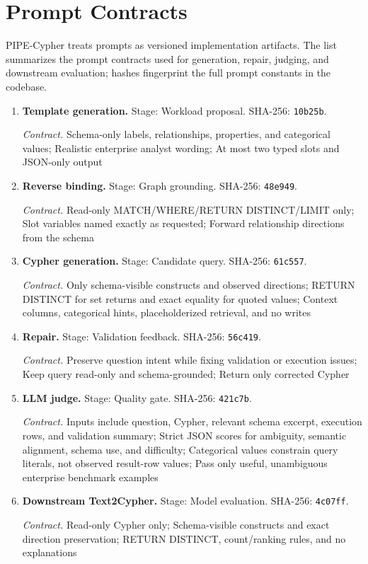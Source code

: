\section{Prompt Contracts}
\label{tab:prompt_contracts}
PIPE-Cypher treats prompts as versioned implementation artifacts. The list summarizes the prompt contracts used for generation, repair, judging, and downstream evaluation; hashes fingerprint the full prompt constants in the codebase.
\begin{enumerate}
\item \textbf{Template generation.} Stage: Workload proposal. SHA-256: \texttt{10b25b}.\par
\textit{Contract.} Schema-only labels, relationships, properties, and categorical values; Realistic enterprise analyst wording; At most two typed slots and JSON-only output
\item \textbf{Reverse binding.} Stage: Graph grounding. SHA-256: \texttt{48e949}.\par
\textit{Contract.} Read-only MATCH/WHERE/RETURN DISTINCT/LIMIT only; Slot variables named exactly as requested; Forward relationship directions from the schema
\item \textbf{Cypher generation.} Stage: Candidate query. SHA-256: \texttt{61c557}.\par
\textit{Contract.} Only schema-visible constructs and observed directions; RETURN DISTINCT for set returns and exact equality for quoted values; Context columns, categorical hints, placeholderized retrieval, and no writes
\item \textbf{Repair.} Stage: Validation feedback. SHA-256: \texttt{56c419}.\par
\textit{Contract.} Preserve question intent while fixing validation or execution issues; Keep query read-only and schema-grounded; Return only corrected Cypher
\item \textbf{LLM judge.} Stage: Quality gate. SHA-256: \texttt{421c7b}.\par
\textit{Contract.} Inputs include question, Cypher, relevant schema excerpt, execution rows, and validation summary; Strict JSON scores for ambiguity, semantic alignment, schema use, and difficulty; Categorical values constrain query literals, not observed result-row values; Pass only useful, unambiguous enterprise benchmark examples
\item \textbf{Downstream Text2Cypher.} Stage: Model evaluation. SHA-256: \texttt{4c07ff}.\par
\textit{Contract.} Read-only Cypher only; Schema-visible constructs and exact direction preservation; RETURN DISTINCT, count/ranking rules, and no explanations
\end{enumerate}
